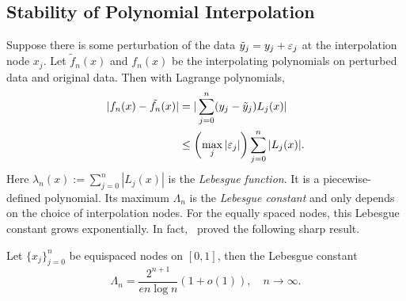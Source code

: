 \subsection{Stability of Polynomial Interpolation}
\label{SSec: 2-Sta-Pol-Int}
Suppose there is some perturbation of the data $\tilde{y}_j = y_j + \varepsilon_j$ at the interpolation node $x_j$. Let $\tilde{f}_n(x)$ and $f_n(x)$ be the interpolating polynomials on perturbed data and original data. Then with Lagrange polynomials, 
\begin{equation}
    \begin{aligned}
        |f_n(x) - \tilde{f_n}(x)| &= |\sum_{j=0}^n (y_j - \tilde{y}_j) L_j(x)| \\
        &\le \left(\max_{j} |\varepsilon_j|\right) \sum_{j=0}^n |L_j(x)|.
    \end{aligned}
\end{equation}
Here $\lambda_n(x) := \sum_{j=0}^n |L_j(x)|$ is the \emph{Lebesgue function}. It is a piecewise-defined polynomial. Its maximum $\Lambda_n$ is the \emph{Lebesgue constant} and only depends on the choice of interpolation nodes. 
For the equally spaced nodes, this Lebesgue constant grows exponentially. In fact,~\cite{turetskii1940bounding} proved the following sharp result.
\begin{lemma}
    \label{Lem: 2-Leb-Con}
    Let $\{x_j\}_{j=0}^n$ be equispaced nodes on $[0, 1]$, then the Lebesgue constant 
    \begin{equation}
      \Lambda_n  =  \frac{2^{n+1}}{e n \log n} \left(1 + o(1)\right), \quad n\to\infty. 
    \end{equation}
\end{lemma}
